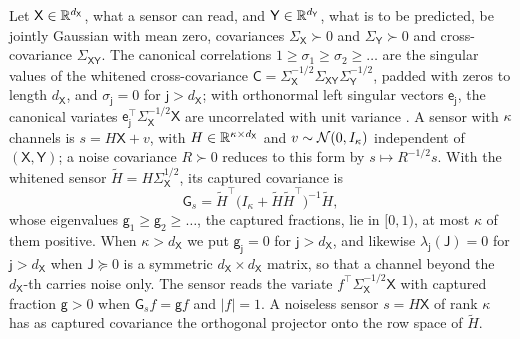 \begin{definition}\label{def:env-sensor}
Let $\mathsf X\in\mathbb{R}^{d_{\mathsf X}}$, what a sensor can read, and $\mathsf Y\in\mathbb{R}^{d_{\mathsf Y}}$, what is to be predicted, be jointly Gaussian with mean zero, covariances $\Sigma_{\mathsf X}\succ0$ and $\Sigma_{\mathsf Y}\succ0$ and cross-covariance $\Sigma_{\mathsf X\mathsf Y}$. The canonical correlations $1\ge\sigma_1\ge\sigma_2\ge\dots$ are the singular values of the whitened cross-covariance $\mathsf C=\Sigma_{\mathsf X}^{-1/2}\Sigma_{\mathsf X\mathsf Y}\Sigma_{\mathsf Y}^{-1/2}$, padded with zeros to length $d_{\mathsf X}$, and $\sigma_{\mathsf j}=0$ for $\mathsf j>d_{\mathsf X}$; with orthonormal left singular vectors $\mathsf e_{\mathsf j}$, the canonical variates $\mathsf e_{\mathsf j}^\top\Sigma_{\mathsf X}^{-1/2}\mathsf X$ are uncorrelated with unit variance \citep{hotelling1936relations}. A sensor with $\kappa$ channels is $s=H\mathsf X+v$, with $H\in\mathbb{R}^{\kappa\times d_{\mathsf X}}$ and $v\sim\mathcal{N}(0,I_\kappa)$ independent of $(\mathsf X,\mathsf Y)$; a noise covariance $R\succ0$ reduces to this form by $s\mapsto R^{-1/2}s$. With the whitened sensor $\tilde H=H\Sigma_{\mathsf X}^{1/2}$, its captured covariance is
\[
\mathsf G_s=\tilde H^\top\bigl(I_\kappa+\tilde H\tilde H^\top\bigr)^{-1}\tilde H,
\]
whose eigenvalues $\mathsf g_1\ge\mathsf g_2\ge\dots$, the captured fractions, lie in $[0,1)$, at most $\kappa$ of them positive. When $\kappa>d_{\mathsf X}$ we put $\mathsf g_{\mathsf j}=0$ for $\mathsf j>d_{\mathsf X}$, and likewise $\lambda_{\mathsf j}(\mathsf J)=0$ for $\mathsf j>d_{\mathsf X}$ when $\mathsf J\succeq0$ is a symmetric $d_{\mathsf X}\times d_{\mathsf X}$ matrix, so that a channel beyond the $d_{\mathsf X}$-th carries noise only. The sensor reads the variate $f^\top\Sigma_{\mathsf X}^{-1/2}\mathsf X$ with captured fraction $\mathsf g>0$ when $\mathsf G_sf=\mathsf gf$ and $\lvert f\rvert=1$. A noiseless sensor $s=H\mathsf X$ of rank $\kappa$ has as captured covariance the orthogonal projector onto the row space of $\tilde H$.
\end{definition}

